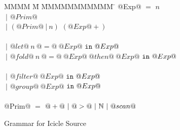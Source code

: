 
\begin{figure}

\begin{tabbing}
MMMM \= M \= MMMMMMMMMMM \= \kill
@Exp@
    \> $=$  \> $n$          \\
    \> $~|$ \> $@Prim@$     \\
    \> $~|$ \> $(@Prim@~|~n)$     \> $(@Exp@+)$ \\
\\
    \> $~|$ \> $@let@~n~@=@~@Exp@$
            \> $\mathtt{in}~@Exp@$ \\
    \> $~|$ \> $@fold@~n~@=@~@Exp@~@then@~@Exp@$
            \> $\mathtt{in}~@Exp@$ \\
\\
    \> $~|$ \> $@filter@~@Exp@$
            \> $\mathtt{in}~@Exp@$ \\
    \> $~|$ \> $@group@~@Exp@$
            \> $\mathtt{in}~@Exp@$ \\
\\
@Prim@
    \> $=$  \> $@+@~|~@>@~|~\mathbb{N}~|~@scan@$ \\
\end{tabbing}


\caption{Grammar for Icicle Source}
\label{fig:source:grammar}
\end{figure}


